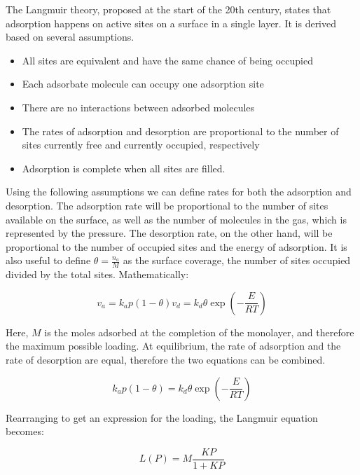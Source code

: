 The Langmuir theory, proposed at the start of the 20th century, states that
adsorption happens on active sites on a surface in a single layer. It is
derived based on several assumptions.

\begin{itemize}
    
    \item All sites are equivalent and have the same chance of being occupied
    \item Each adsorbate molecule can occupy one adsorption site
    \item There are no interactions between adsorbed molecules
    \item The rates of adsorption and desorption are proportional to the number
    of sites currently free and currently occupied, respectively
    \item Adsorption is complete when all sites are filled.
    
\end{itemize}

Using the following assumptions we can define rates for both the adsorption and
desorption. The adsorption rate will be proportional to the number of sites available
on the surface, as well as the number of molecules in the gas, which is represented by
the pressure. The desorption rate, on the other hand, will be proportional to the
number of occupied sites and the energy of adsorption.
It is also useful to define \(\theta = \frac{n_a}{M}\) as the surface coverage,
the number of sites occupied divided by the total sites. Mathematically:

\begin{equation}
    v_a = k_a p (1 - \theta)
    v_d = k_d \theta \exp{(-\frac{E}{RT})}
\end{equation}

Here, \(M\) is the moles adsorbed at the completion of the monolayer, and therefore
the maximum possible loading. At equilibrium, the rate of adsorption and the rate of
desorption are equal, therefore the two equations can be combined.

\begin{equation}
    k_a p (1 - \theta) = k_d \theta \exp{(-\frac{E}{RT})}
\end{equation}

Rearranging to get an expression for the loading, the Langmuir equation becomes:

\begin{equation}
    L(P) = M\frac{KP}{1+KP}
\end{equation}

